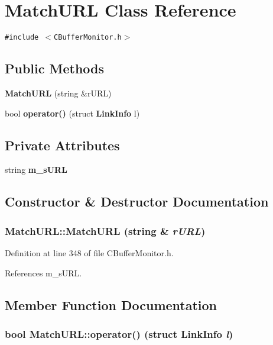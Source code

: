 \section{Match\-URL  Class Reference}
\label{classMatchURL}
{\tt \#include $<$CBuffer\-Monitor.h$>$}

\subsection*{Public Methods}
\begin{CompactItemize}
\item 
{\bf Match\-URL} (string \&r\-URL)
\item 
bool {\bf operator()} (struct {\bf Link\-Info} l)
\end{CompactItemize}
\subsection*{Private Attributes}
\begin{CompactItemize}
\item 
string {\bf m\_\-s\-URL}
\end{CompactItemize}


\subsection{Constructor \& Destructor Documentation}
\subsubsection{\setlength{\rightskip}{0pt plus 5cm}Match\-URL::Match\-URL (string \& {\em r\-URL})\hspace{0.3cm}{\tt  [inline]}}\label{classMatchURL_a0}




Definition at line 348 of file CBuffer\-Monitor.h.

References m\_\-s\-URL.

\subsection{Member Function Documentation}
\subsubsection{\setlength{\rightskip}{0pt plus 5cm}bool Match\-URL::operator() (struct {\bf Link\-Info} {\em l})\hspace{0.3cm}{\tt  [inline]}}\label{classMatchURL_a1}





